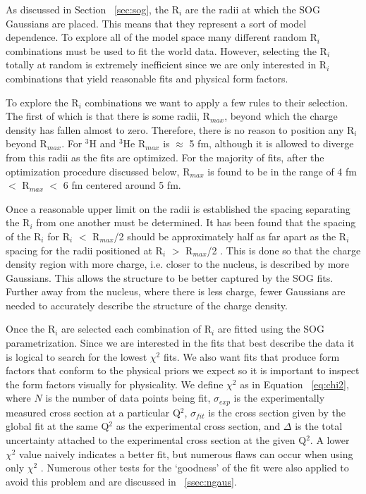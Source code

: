 As discussed in Section ~\ref{sec:sog}, the R$_i$ are the radii at which the SOG Gaussians are placed. This means that they represent a sort of model dependence. To explore all of the model space many different random R$_i$ combinations must be used to fit the world data. However, selecting the R$_i$ totally at random is extremely inefficient since we are only interested in R$_i$ combinations that yield reasonable fits and physical form factors. 

To explore the R$_i$ combinations we want to apply a few rules to their selection. The first of which is that there is some radii, R$_{max}$, beyond which the charge density has fallen almost to zero. Therefore, there is no reason to position any R$_i$ beyond R$_{max}$. For $^3$H and $^3$He R$_{max}$ is $\approx$ 5 fm, although it is allowed to diverge from this radii as the fits are optimized. For the majority of fits, after the optimization procedure discussed below, R$_{max}$ is found to be in the range of 4 fm $<$ R$_{max}$ $<$ 6 fm centered around 5 fm.

Once a reasonable upper limit on the radii is established the spacing separating the R$_i$ from one another must be determined. It has been found that the spacing of the R$_i$ for R$_i$ $<$ R$_{max}$/2 should be approximately half as far apart as the R$_i$ spacing for the radii positioned at R$_i$ $>$ R$_{max}$/2 \cite{Article:SOG}. This is done so that the charge density region with more charge, i.e. closer to the nucleus, is described by more Gaussians. This allows the structure to be better captured by the SOG fits. Further away from the nucleus, where there is less charge, fewer Gaussians are needed to accurately describe the structure of the charge density.   

Once the R$_i$ are selected each combination of R$_i$ are fitted using the SOG parametrization. Since we are interested in the fits that best describe the data it is logical to search for the lowest $\chi^2$ fits. We also want fits that produce form factors that conform to the physical priors we expect so it is important to inspect the form factors visually for physicality. We define $\chi^2$ as in Equation ~\ref{eq:chi2}, where $N$ is the number of data points being fit, $\sigma_{exp}$ is the experimentally measured cross section at a particular Q$^2$, $\sigma_{fit}$ is the cross section given by the global fit at the same Q$^2$ as the experimental cross section, and $\Delta$ is the total uncertainty attached to the experimental cross section at the given Q$^2$. A lower $\chi^2$ value naively indicates a better fit, but numerous flaws can occur when using only $\chi^2$ \cite{doug_stats}. Numerous other tests for the `goodness' of the fit were also applied to avoid this problem and are discussed in ~\ref{ssec:ngaus}.  

